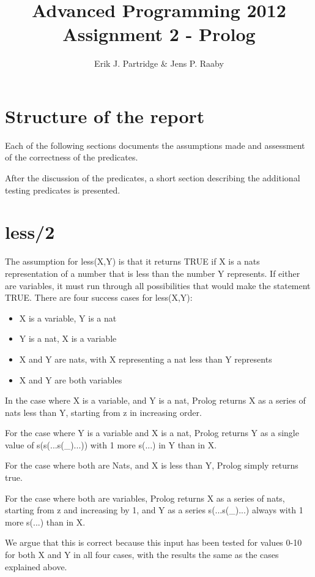 \documentclass{article}
\title{Advanced Programming 2012\\
Assignment 2 - Prolog}
\author{Erik J. Partridge \& Jens P. Raaby}
\begin{document}
 
\maketitle

\section{Structure of the report}
Each of the following sections documents the assumptions made and assessment of the correctness of the predicates. 

After the discussion of the predicates, a short section describing the additional testing predicates is presented.

\section{less/2}
The assumption for less(X,Y) is that it returns TRUE if X is a nats representation of a number that is less than the number Y represents. If either are variables, it must run through all possibilities that would make the statement TRUE.
There are four success cases for less(X,Y):
\begin{itemize}

    \item X is a variable, Y is a nat

    \item Y is a nat, X is a variable

    \item X and Y are nats, with X representing a nat less than Y represents

    \item X and Y are both variables
\end{itemize}


In the case where X is a variable, and Y is a nat, Prolog returns X as a series of nats less than Y, starting from z in increasing order.

For the case where Y is a variable and X is a nat, Prolog returns Y as a single value of s(s(...s(\_)...)) with 1 more s(...) in Y than in X.

For the case where both are Nats, and X is less than Y, Prolog simply returns true.

For the case where both are variables, Prolog returns X as a series of nats, starting from z and increasing by 1, and Y as a series s(...s(\_)...) always with 1 more s(...) than in X.

We argue that this is correct because this input has been tested for values 0-10 for both X and Y in all four cases, with the results the same as the cases explained above.
\end{document}

